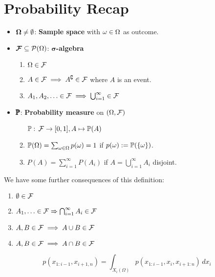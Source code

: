 \section{Probability Recap}

\begin{definition*}
  \begin{itemize}
    \item \(\bm{\O} \neq \emptyset\): \textbf{Sample space} with \(\omega \in \O\) as outcome.
    \item \(\bm{\F}\subseteq \Pow(\O)\): \textbf{\(\bm{\sigma}\)-algebra}
    \begin{enumerate}
      \item \(\Omega \in \F\)
      \item \(A \in \F \implies A^\complement \in \F\) where \(A\) is an event.
      \item \(A_1, A_2, \ldots \in \F \implies \bigcup_{i=1}^\infty \in \F\)
    \end{enumerate}
    \item \(\pmb{\P}\): \textbf{Probability measure} on \((\O, \F)\)
    \begin{enumerate}
      \item[\(\P:\)] \(\F \to [0, 1], A \mapsto \P(A)\)
      \item \(\P(\O) = \sum_{\omega \in \O} p(\omega) = 1\) if \(p(\omega) := \P(\{\omega\})\).
      \item \(P(A) = \sum_{i=1}^\infty P(A_i)\) if \(A = \bigcup_{i=1}^\infty A_i\) disjoint.
    \end{enumerate}
  \end{itemize}
\end{definition*}

We have some further consequences of this definition:
\begin{enumerate}
  \item \(\emptyset \in \F\)
  \item \(A_1, \ldots \in \F \Rightarrow \bigcap_{i=1}^\infty A_i \in \F\)
  \item \(A, B \in \F \implies A \cup B \in \F\)
  \item \(A, B \in \F \implies A \cap B \in \F\)
\end{enumerate}

\begin{definition*}
  \[p(x_{1:i-1}, x_{i+1,n}) = \int_{X_i(\Omega)}p(x_{1:i-1}, x_i, x_{i+1:n}) \,dx_i\]
\end{definition*}

